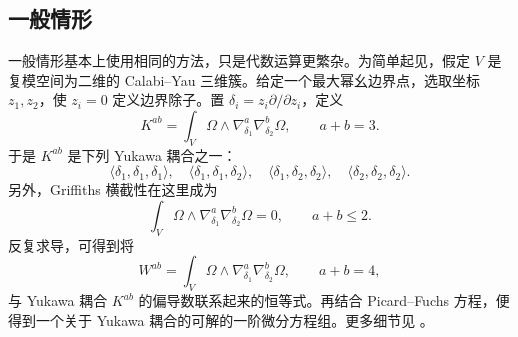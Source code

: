\subsection{一般情形}\label{subsec:yukawa-general}

一般情形基本上使用相同的方法，只是代数运算更繁杂。为简单起见，假定 $V$ 是复模空间为二维的 Calabi--Yau 三维簇。给定一个最大幂幺边界点，选取坐标 $z_1,z_2$，使 $z_i=0$ 定义边界除子。置 $\delta_i=z_i\partial/\partial z_i$，定义
\[
K^{ab}=\int_V\Omega\wedge\nabla_{\delta_1}^{a}\nabla_{\delta_2}^{b}\Omega,
\qquad a+b=3.
\]
于是 $K^{ab}$ 是下列 Yukawa 耦合之一：
\[
\langle\delta_1,\delta_1,\delta_1\rangle,\quad
\langle\delta_1,\delta_1,\delta_2\rangle,\quad
\langle\delta_1,\delta_2,\delta_2\rangle,\quad
\langle\delta_2,\delta_2,\delta_2\rangle.
\]
另外，Griffiths 横截性在这里成为
\begin{equation}\label{eq:yukawa-transversality}
\int_V\Omega\wedge\nabla_{\delta_1}^{a}\nabla_{\delta_2}^{b}\Omega=0,
\qquad a+b\leq2.
\end{equation}
反复求导，可得到将
\begin{equation}\label{eq:yukawa-fourth-integrals}
W^{ab}=\int_V\Omega\wedge\nabla_{\delta_1}^{a}\nabla_{\delta_2}^{b}\Omega,
\qquad a+b=4,
\end{equation}
与 Yukawa 耦合 $K^{ab}$ 的偏导数联系起来的恒等式。再结合 Picard--Fuchs 方程，便得到一个关于 Yukawa 耦合的可解的一阶微分方程组。更多细节见 。

